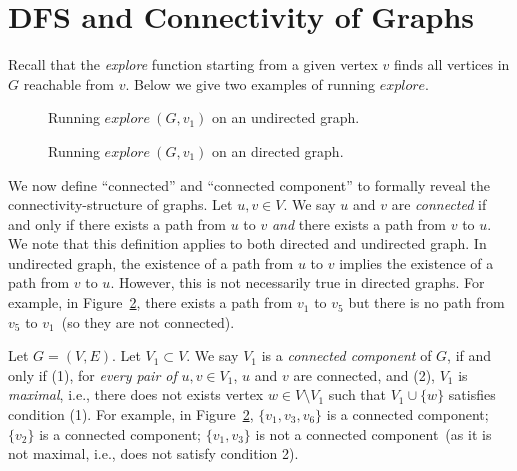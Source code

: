 \section*{DFS and Connectivity of Graphs}


Recall that the \emph{explore} function starting from a given vertex $v$ finds
all vertices in $G$ reachable from $v$.  Below we give two examples of running $explore$. 

\begin{figure}[h!]
\centering{}
\caption{Running $explore~(G, v_1)$ on an undirected graph.}
\label{fig:explore-undirected}
\end{figure}

\begin{figure}[h!]
\centering{}
\caption{Running $explore~(G, v_1)$ on an directed graph.}
\label{fig:explore-directed}
\end{figure}

We now define ``connected'' and ``connected component'' to formally reveal the connectivity-structure of graphs.
Let $u,v\in V$. We say $u$ and $v$ are \emph{connected} if and only if there exists a path from $u$ to $v$
\emph{and} there exists a path from $v$ to $u$. 
We note that this definition applies to both directed and undirected graph.
In undirected graph, the existence of a path from $u$ to $v$ implies the
existence of a path from $v$ to $u$. However, this is not necessarily true in directed
graphs. For example, in Figure~\ref{fig:explore-directed}, there exists a path from $v_1$ to $v_5$ but there is no path
from $v_5$ to $v_1$~(so they are not connected).

Let $G = (V, E)$. Let $V_1\subset V$. We say $V_1$ is a \emph{connected component} of $G$,
if and only if (1), for \emph{every pair of} $u,v\in V_1$, $u$ and $v$ are connected,
and (2), $V_1$ is \emph{maximal}, i.e., there does not exists vertex $w\in V\setminus V_1$ such
that $V_1\cup \{w\}$ satisfies condition (1).
For example, in Figure~\ref{fig:explore-directed}, $\{v_1, v_3, v_6\}$ is a connected component;
$\{v_2\}$ is a connected component; 
$\{v_1, v_3\}$ is not a connected component~(as it is not maximal, i.e., does not satisfy condition 2). 

